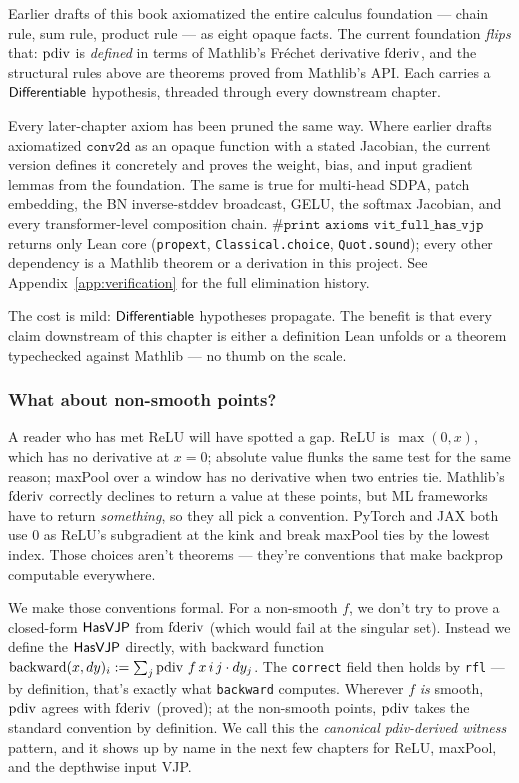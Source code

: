 Earlier drafts of this book axiomatized the entire calculus
foundation --- chain rule, sum rule, product rule --- as eight
opaque facts. The current foundation \emph{flips} that: \(\operatorname{pdiv}\)
is \emph{defined} in terms of Mathlib's Fréchet derivative
\(\operatorname{fderiv}\), and the structural rules above are theorems proved
from Mathlib's API. Each carries a \(\mathsf{Differentiable}\) hypothesis,
threaded through every downstream chapter.

Every later-chapter axiom has been pruned the same way. Where
earlier drafts axiomatized \(\texttt{conv2d}\) as an opaque
function with a stated Jacobian, the current version defines it
concretely and proves the weight, bias, and input gradient lemmas
from the foundation. The same is true for multi-head SDPA, patch
embedding, the BN inverse-stddev broadcast, GELU, the softmax
Jacobian, and every transformer-level composition chain. \(\texttt{\#print axioms vit\_full\_has\_vjp}\) returns only Lean
core (\texttt{propext}, \texttt{Classical.choice},
\texttt{Quot.sound}); every other dependency is a Mathlib theorem
or a derivation in this project. See Appendix~\ref{app:verification} for
the full elimination history.

The cost is mild: \(\mathsf{Differentiable}\) hypotheses propagate. The
benefit is that every claim downstream of this chapter is either
a definition Lean unfolds or a theorem typechecked against
Mathlib --- no thumb on the scale.

\subsubsection*{What about non-smooth points?}

A reader who has met ReLU will have spotted a gap. ReLU is
$\max(0, x)$, which has no derivative at $x=0$; absolute value
flunks the same test for the same reason; maxPool over a window
has no derivative when two entries tie. Mathlib's \(\operatorname{fderiv}\)
correctly declines to return a value at these points, but ML
frameworks have to return \emph{something}, so they all pick a
convention. PyTorch and JAX both use $0$ as ReLU's subgradient at
the kink and break maxPool ties by the lowest index.
Those choices aren't theorems --- they're conventions that make
backprop computable everywhere.

We make those conventions formal. For a non-smooth $f$, we don't
try to prove a closed-form \(\mathsf{HasVJP}\) from \(\operatorname{fderiv}\) (which would
fail at the singular set). Instead we define the \(\mathsf{HasVJP}\) directly,
with backward function
$\mathrm{backward}(x, dy)_i := \sum_j \operatorname{pdiv}\, f\, x\, i\, j \cdot dy_j$.
The \texttt{correct} field then holds by \texttt{rfl} --- by
definition, that's exactly what \texttt{backward} computes. Wherever
$f$ \emph{is} smooth, \(\operatorname{pdiv}\) agrees with \(\operatorname{fderiv}\) (proved);
at the non-smooth points, \(\operatorname{pdiv}\) takes the standard convention by
definition. We call this the \emph{canonical pdiv-derived witness}
pattern, and it shows up by name in the next few chapters for ReLU,
maxPool, and the depthwise input VJP.

